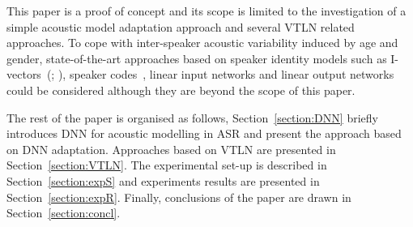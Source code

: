 \documentclass{nle}
\begin{document}
%
%
This  paper is a  proof of  concept and  its scope  is limited  to the
investigation  of  a simple acoustic  model  adaptation approach  and
several VTLN related  approaches.  To cope with inter-speaker acoustic variability induced by 
age and gender, state-of-the-art approaches
based      on      speaker      identity      models      such      as
I-vectors~(\citealp*{dehak2011front,saon2013speaker};
\citealp{42536}),  speaker codes~\citep*{abdel2013fast},  linear input
networks  and  linear  output  networks~\citep*{li2010comparison}  could be considered 
although they are beyond the scope of this paper.


The    rest    of    the    paper    is    organised    as    follows,
Section~\ref{section:DNN}   briefly   introduces   DNN  for   acoustic
modelling   in   ASR  and   present   the   approach   based  on   DNN
adaptation.    Approaches   based   on    VTLN   are    presented   in
Section~\ref{section:VTLN}.  The experimental  set-up  is described  in
Section~\ref{section:expS}  and experiments  results are  presented in
Section~\ref{section:expR}.  Finally,  conclusions  of the  paper  are
drawn in Section~\ref{section:concl}.
\end{document}
